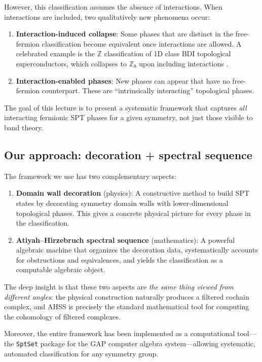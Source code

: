 \documentclass{SciPost}
\theoremstyle{definition}
\newcommand{\Z}{\mathbb{Z}}
\begin{document}
However, this classification assumes the absence of interactions.
When interactions are included, two qualitatively new phenomena occur:
\begin{enumerate}[label=(\roman*)]
    \item \textbf{Interaction-induced collapse}: Some phases that are distinct in the free-fermion classification become equivalent once interactions are allowed.
    A celebrated example is the $\Z$ classification of 1D class BDI topological superconductors, which collapses to $\Z_8$ upon including interactions \cite{Fidkowski2010, Fidkowski2011}.
    \item \textbf{Interaction-enabled phases}: New phases can appear that have no free-fermion counterpart.
    These are ``intrinsically interacting'' topological phases.
\end{enumerate}
The goal of this lecture is to present a systematic framework that captures \emph{all} interacting fermionic SPT phases for a given symmetry, not just those visible to band theory.

\subsection{Our approach: decoration + spectral sequence}

The framework we use has two complementary aspects:
\begin{enumerate}[label=(\roman*)]
    \item \textbf{Domain wall decoration} (physics): A constructive method to build SPT states by decorating symmetry domain walls with lower-dimensional topological phases.
    This gives a concrete physical picture for every phase in the classification.
    \item \textbf{Atiyah--Hirzebruch spectral sequence} (mathematics): A powerful algebraic machine that organizes the decoration data, systematically accounts for obstructions and equivalences, and yields the classification as a computable algebraic object.
\end{enumerate}
The deep insight is that these two aspects are \emph{the same thing viewed from different angles}: the physical construction naturally produces a filtered cochain complex, and AHSS is precisely the standard mathematical tool for computing the cohomology of filtered complexes.

Moreover, the entire framework has been implemented as a computational tool---the \texttt{SptSet} package for the GAP computer algebra system---allowing systematic, automated classification for any symmetry group.
\end{document}
